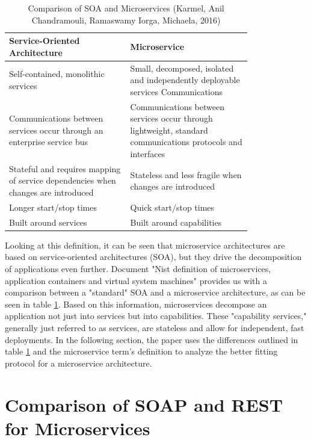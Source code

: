 \documentclass[conference]{IEEEtran}
\begin{document}
\begin{table}[!htbp]
	\centering
	\caption{Comparison of SOA and Microservices (Karmel, Anil
		Chandramouli, Ramaswamy
		Iorga, Michaela, 2016)}
	\label{micro:comparison}
	\begin{tabular}{| p{0.4\linewidth} | p{0.4\linewidth}|}\hline
		Service-Oriented Architecture & Microservice \\\hline
	Self-contained, monolithic services & Small, decomposed, isolated and independently deployable services Communications\\\hline
		Communications between services occur through an enterprise service bus & Communications between services occur through lightweight, standard communications protocols and interfaces\\\hline
		Stateful and requires mapping of service dependencies when changes are introduced & Stateless and less fragile when changes are introduced\\\hline
		Longer start/stop times & Quick start/stop times\\\hline
		Built around services & Built around capabilities\\\hline
	\end{tabular}
\end{table}

Looking at this definition, it can be seen that microservice architectures are based on service-oriented architectures (SOA), but they drive the decomposition of applications even further. Document "Nist definition of microservices, application containers and virtual system machines" \cite{karmel2016nist} provides us with a comparison between a "standard" SOA and a microservice architecture, as can be seen in table \ref{micro:comparison}. Based on this information, microservices decompose an application not just into services but into capabilities. These "capability services," generally just referred to as services, are stateless and allow for independent, fast deployments. In the following section, the paper uses the differences outlined in table \ref{micro:comparison} and the microservice term's definition to analyze the better fitting protocol for a microservice architecture.

\section{Comparison of SOAP and REST for Microservices}
\label{sec:comp}
\end{document}
